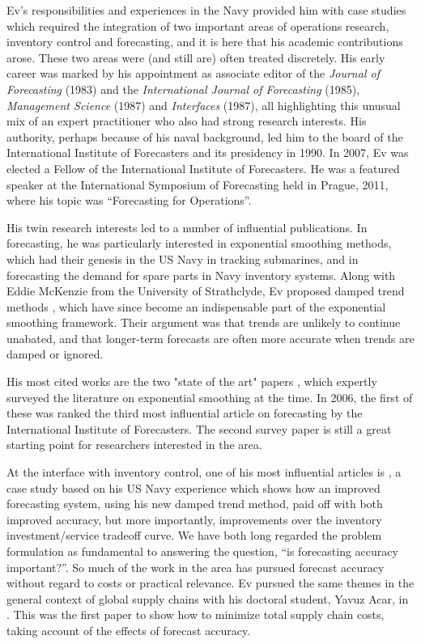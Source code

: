 \documentclass[11pt, a4paper]{article}
\begin{document}
Ev's responsibilities and experiences in the Navy provided him with case studies which required the integration of two important areas of operations research, inventory control and forecasting, and it is here that his academic contributions arose. These two areas were (and still are) often treated discretely. His early career was marked by his appointment as associate editor of the \emph{Journal of Forecasting} (1983) and the \emph{International Journal of Forecasting} (1985), \emph{Management Science} (1987) and \emph{Interfaces} (1987), all highlighting this unusual mix of an expert practitioner who also had strong research interests. His authority, perhaps because of his naval background, led him to the board of the International Institute of Forecasters and its presidency in 1990. In 2007, Ev was elected a Fellow of the International Institute of Forecasters. He was a featured speaker at the International Symposium of Forecasting held in Prague, 2011, where his topic was ``Forecasting for Operations''.

His twin research interests led to a number of influential publications. In forecasting, he was particularly interested in exponential smoothing methods, which had their genesis in the US Navy in tracking submarines, and in forecasting the demand for spare parts in Navy inventory systems. Along with Eddie McKenzie from the University of Strathclyde, Ev proposed damped trend methods \citep{Gardner1985-lk,Gardner1989-bi}, which have since become an indispensable part of the exponential smoothing framework. Their argument was that trends are unlikely to continue unabated, and that longer-term forecasts are often more accurate when trends are damped or ignored.

His most cited works are the two "state of the art" papers \citep{Gardner1985-yu,Gardner2006-qq}, which expertly surveyed the literature on exponential smoothing at the time. In 2006, the first of these was ranked the third most influential article on forecasting by the International Institute of Forecasters. The second survey paper is still a great starting point for researchers interested in the area.

At the interface with inventory control, one of his most influential articles is \citet{Gardner1990-pw}, a case study based on his US Navy experience which shows how an  improved forecasting system, using his new damped trend method, paid off with both improved accuracy, but more importantly, improvements over the inventory investment/service tradeoff curve. We have both long regarded the problem formulation as fundamental to answering the question, ``is forecasting accuracy important?''. So much of the work in the area has pursued forecast accuracy without regard to costs or practical relevance. Ev pursued the same themes in the general context of global supply chains with his doctoral student, Yavuz Acar, in \citet{Acar2012ForecastingMS}. This was the first paper to show how to minimize total supply chain costs, taking account of the effects of forecast accuracy.
\end{document}

